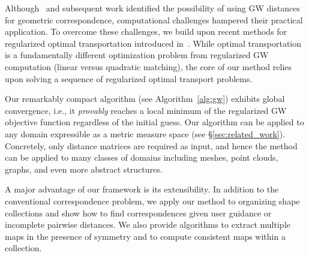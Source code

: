  Although~\cite{memoli-2011} and subsequent work identified the possibility of using GW distances for geometric correspondence, computational challenges hampered their practical application.  To overcome these challenges, we build upon recent methods for regularized optimal transportation introduced in~\cite{benamou-2015,solomon-2015}.  While optimal transportation is a fundamentally different optimization problem from regularized GW computation (linear versus quadratic matching), the core of our method relies upon solving a sequence of regularized optimal transport problems. %

Our remarkably compact algorithm (see Algorithm~\ref{alg:gw}) exhibits global convergence, i.e., it \emph{provably} reaches a local minimum of the regularized GW objective function regardless of the initial guess.  Our algorithm can be applied to any domain expressible as a metric measure space (see \S\ref{sec:related_work}).  Concretely, only distance matrices are required as input, and hence the method can be applied to many classes of domains including meshes, point clouds, graphs, and even more abstract  structures. 

A major advantage of our framework is its extensibility.  In addition to the conventional correspondence problem, we apply our method to organizing shape collections and show how to find correspondences given user guidance or incomplete pairwise distances.  We also provide algorithms to extract multiple maps in the presence of symmetry and to compute consistent maps within a collection.%


